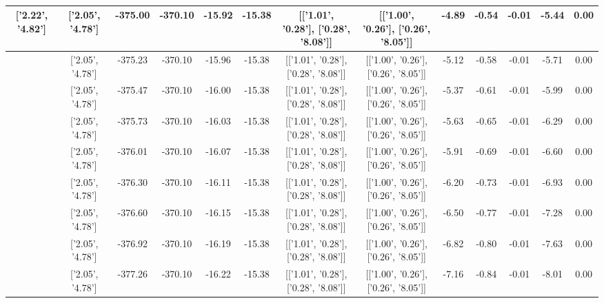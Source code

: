 \begin{table}[htbp]
\begin{adjustbox}{angle=90}
\begin{tabular}{|c|c|c|c|c|c|c|c|c|c|c|c|c|}
 ['2.22', '4.82'] & ['2.05', '4.78'] & -375.00 & -370.10 & -15.92 & -15.38 & [['1.01', '0.28'], ['0.28', '8.08']] & [['1.00', '0.26'], ['0.26', '8.05']] & -4.89 & -0.54 & -0.01 & -5.44 & 0.00\\ \hline
 ['2.24', '4.82'] & ['2.05', '4.78'] & -375.23 & -370.10 & -15.96 & -15.38 & [['1.01', '0.28'], ['0.28', '8.08']] & [['1.00', '0.26'], ['0.26', '8.05']] & -5.12 & -0.58 & -0.01 & -5.71 & 0.00\\ \hline
 ['2.25', '4.82'] & ['2.05', '4.78'] & -375.47 & -370.10 & -16.00 & -15.38 & [['1.01', '0.28'], ['0.28', '8.08']] & [['1.00', '0.26'], ['0.26', '8.05']] & -5.37 & -0.61 & -0.01 & -5.99 & 0.00\\ \hline
 ['2.26', '4.83'] & ['2.05', '4.78'] & -375.73 & -370.10 & -16.03 & -15.38 & [['1.01', '0.28'], ['0.28', '8.08']] & [['1.00', '0.26'], ['0.26', '8.05']] & -5.63 & -0.65 & -0.01 & -6.29 & 0.00\\ \hline
 ['2.27', '4.83'] & ['2.05', '4.78'] & -376.01 & -370.10 & -16.07 & -15.38 & [['1.01', '0.28'], ['0.28', '8.08']] & [['1.00', '0.26'], ['0.26', '8.05']] & -5.91 & -0.69 & -0.01 & -6.60 & 0.00\\ \hline
 ['2.28', '4.83'] & ['2.05', '4.78'] & -376.30 & -370.10 & -16.11 & -15.38 & [['1.01', '0.28'], ['0.28', '8.08']] & [['1.00', '0.26'], ['0.26', '8.05']] & -6.20 & -0.73 & -0.01 & -6.93 & 0.00\\ \hline
 ['2.29', '4.83'] & ['2.05', '4.78'] & -376.60 & -370.10 & -16.15 & -15.38 & [['1.01', '0.28'], ['0.28', '8.08']] & [['1.00', '0.26'], ['0.26', '8.05']] & -6.50 & -0.77 & -0.01 & -7.28 & 0.00\\ \hline
 ['2.30', '4.84'] & ['2.05', '4.78'] & -376.92 & -370.10 & -16.19 & -15.38 & [['1.01', '0.28'], ['0.28', '8.08']] & [['1.00', '0.26'], ['0.26', '8.05']] & -6.82 & -0.80 & -0.01 & -7.63 & 0.00\\ \hline
 ['2.32', '4.84'] & ['2.05', '4.78'] & -377.26 & -370.10 & -16.22 & -15.38 & [['1.01', '0.28'], ['0.28', '8.08']] & [['1.00', '0.26'], ['0.26', '8.05']] & -7.16 & -0.84 & -0.01 & -8.01 & 0.00\\ \hline
            \end{tabular}
        \end{adjustbox}
        \caption{}
        \label{}
    \end{table}
    
